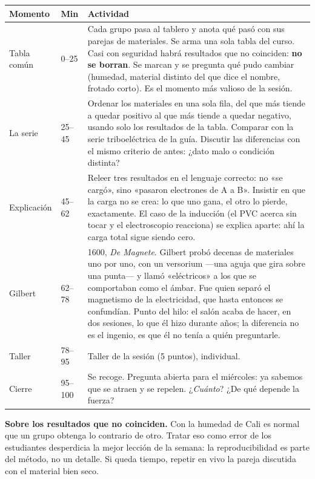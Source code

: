\documentclass[11pt]{article}
\begin{document}
\begin{center}
{\renewcommand{\arraystretch}{1.3}
\begin{tabularx}{\linewidth}{@{}l l X@{}}
  \toprule
  \textbf{Momento} & \textbf{Min} & \textbf{Actividad}\\
  \midrule
  Tabla común & 0--25 & Cada grupo pasa al tablero y anota qué pasó con sus parejas de
    materiales. Se arma una sola tabla del curso. Casi con seguridad habrá resultados que no
    coinciden: \textbf{no se borran}. Se marcan y se pregunta qué pudo cambiar (humedad,
    material distinto del que dice el nombre, frotado corto). Es el momento más valioso de la
    sesión.\\
  La serie & 25--45 & Ordenar los materiales en una sola fila, del que más tiende a quedar
    positivo al que más tiende a quedar negativo, usando solo los resultados de la tabla.
    Comparar con la serie triboeléctrica de la guía. Discutir las diferencias con el mismo
    criterio de antes: ¿dato malo o condición distinta?\\
  Explicación & 45--62 & Releer tres resultados en el lenguaje correcto: no «se cargó», sino
    «pasaron electrones de A a B». Insistir en que la carga no se crea: lo que uno gana, el
    otro lo pierde, exactamente. El caso de la inducción (el PVC acerca sin tocar y el
    electroscopio reacciona) se explica aparte: ahí la carga total sigue siendo cero.\\
  Gilbert & 62--78 & 1600, \emph{De Magnete}. Gilbert probó decenas de materiales uno por uno,
    con un versorium —una aguja que gira sobre una punta— y llamó «eléctricos» a los que se
    comportaban como el ámbar. Fue quien separó el magnetismo de la electricidad, que hasta
    entonces se confundían. Punto del hilo: el salón acaba de hacer, en dos sesiones, lo que
    él hizo durante años; la diferencia no es el ingenio, es que él no tenía a quién
    preguntarle.\\
  Taller & 78--95 & Taller de la sesión (5 puntos), individual.\\
  Cierre & 95--100 & Se recoge. Pregunta abierta para el miércoles: ya sabemos que se atraen y
    se repelen. ¿\emph{Cuánto}? ¿De qué depende la fuerza?\\
  \bottomrule
\end{tabularx}}
\end{center}

\begin{nota}
\textbf{Sobre los resultados que no coinciden.} Con la humedad de Cali es normal que un grupo
obtenga lo contrario de otro. Tratar eso como error de los estudiantes desperdicia la mejor
lección de la semana: la reproducibilidad es parte del método, no un detalle. Si queda tiempo,
repetir en vivo la pareja discutida con el material bien seco.
\end{nota}
\end{document}
